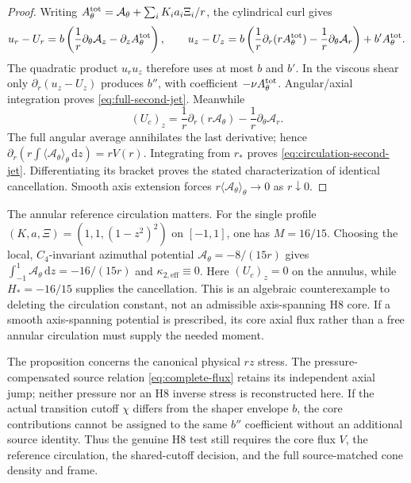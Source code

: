 \documentclass[11pt,a4paper]{article}
\theoremstyle{plain}
\theoremstyle{definition}
\newcommand{\dd}{\,\mathrm{d}}
\begin{document}
\begin{proof}
Writing $A_\theta^{\rm tot}=\mathcal A_\theta+
\sum_iK_i a_i\Xi_i/r$, the cylindrical curl gives
\[
 u_r-U_r=b\left(\frac1r\partial_\theta\mathcal A_z
           -\partial_zA_\theta^{\rm tot}\right),\qquad
 u_z-U_z=b\left(\frac1r\partial_r(rA_\theta^{\rm tot})
              -\frac1r\partial_\theta\mathcal A_r\right)
             +b'A_\theta^{\rm tot}.
\]
The quadratic product $u_ru_z$ therefore uses at most $b$ and
$b'$. In the viscous shear only $\partial_r(u_z-U_z)$
produces $b''$, with coefficient $-\nu A_\theta^{\rm tot}$.
Angular/axial integration proves \eqref{eq:full-second-jet}.
Meanwhile
\[
 (U_c)_z=\frac1r\partial_r(r\mathcal A_\theta)
              -\frac1r\partial_\theta\mathcal A_r .
\]
The full angular average annihilates the last derivative; hence
$\partial_r(r\int\langle\mathcal A_\theta\rangle_\theta\dd z)
=rV(r)$. Integrating from $r_*$ proves
\eqref{eq:circulation-second-jet}. Differentiating its bracket
proves the stated characterization of identical cancellation.
Smooth axis extension forces $r\langle\mathcal A_\theta\rangle_\theta
\to0$ as $r\downarrow0$.
\end{proof}

The annular reference circulation matters. For the single profile
$(K,a,\Xi)=(1,1,(1-z^2)^2)$ on $[-1,1]$, one has $M=16/15$.
Choosing the local, $C_4$-invariant azimuthal potential
$\mathcal A_\theta=-8/(15r)$ gives
$\int_{-1}^1\mathcal A_\theta\dd z=-16/(15r)$ and
$\kappa_{2,\mathrm{eff}}\equiv0$. Here $(U_c)_z=0$ on the
annulus, while $H_*=-16/15$ supplies the cancellation.
This is an algebraic counterexample to deleting the circulation
constant, not an admissible axis-spanning H8 core. If a smooth
axis-spanning potential is prescribed, its core axial flux rather
than a free annular circulation must supply the needed moment.

The proposition concerns the canonical physical $rz$ stress.
The pressure-compensated source relation
\eqref{eq:complete-flux} retains its independent axial jump; neither
pressure nor an H8 inverse stress is reconstructed here. If the
actual transition cutoff $\chi$ differs from the shaper envelope
$b$, the core contributions cannot be assigned to the same
$b''$ coefficient without an additional source identity. Thus
the genuine H8 test still requires the core flux $V$, the
reference circulation, the shared-cutoff decision, and the full
source-matched cone density and frame.
\end{document}
